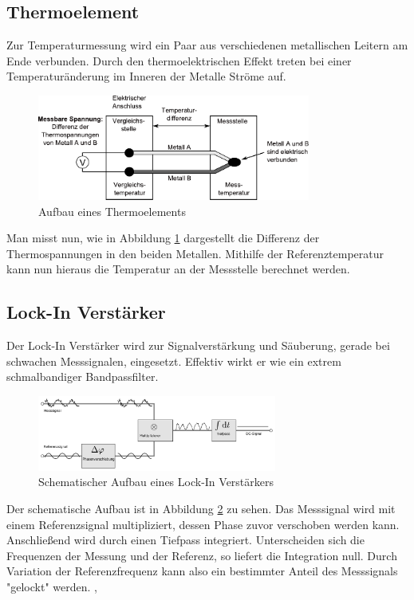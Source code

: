		\subsection{Thermoelement}
Zur Temperaturmessung wird ein Paar aus verschiedenen metallischen Leitern am Ende
verbunden. Durch den thermoelektrischen Effekt treten bei einer Temperaturänderung
im Inneren der Metalle Ströme auf.
\begin{figure}[h]
	\centering
	\includegraphics[width=0.8\textwidth]{Abb/thermo.pdf}
	\caption{Aufbau eines Thermoelements \cite{thermowiki}}
	\label{Abb:thermo}
\end{figure}
Man misst nun, wie in Abbildung \ref{Abb:thermo} dargestellt die Differenz der 
Thermospannungen in den beiden Metallen. Mithilfe der Referenztemperatur kann nun
hieraus die Temperatur an der Messstelle berechnet werden. \cite{thermowiki}

		\subsection{Lock-In Verstärker}
Der Lock-In Verstärker wird zur Signalverstärkung und Säuberung, gerade bei 
schwachen Messsignalen, eingesetzt. Effektiv wirkt er wie ein extrem schmalbandiger
Bandpassfilter.
\begin{figure}[h]
	\centering
	\includegraphics[width=0.7\textwidth]{Abb/lockin.pdf}
	\caption{Schematischer Aufbau eines Lock-In Verstärkers \cite{lockinwiki}}
	\label{Abb:lockin}
\end{figure}
Der schematische Aufbau ist in Abbildung \ref{Abb:lockin} zu sehen. Das Messsignal
wird mit einem Referenzsignal multipliziert, dessen Phase zuvor verschoben werden 
kann. Anschließend wird durch einen Tiefpass integriert. Unterscheiden sich die 
Frequenzen der Messung und der Referenz, so liefert die Integration null. Durch
Variation der Referenzfrequenz kann also ein bestimmter Anteil des Messsignals
"gelockt" werden. \cite{lockinwiki}, \cite{kreuzwiki}